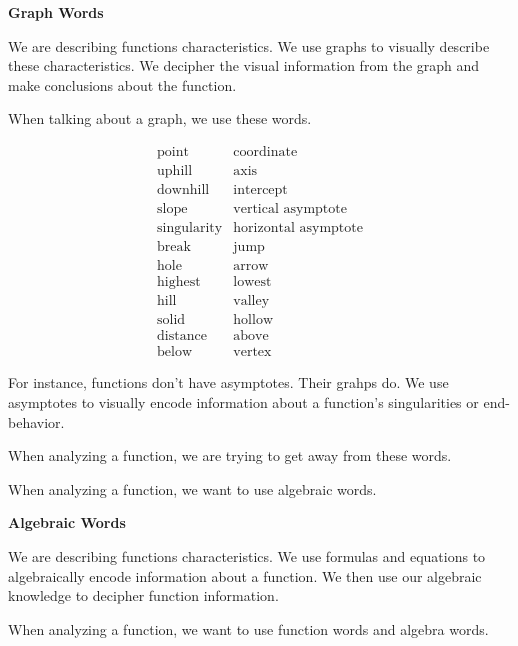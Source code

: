 \documentclass{ximera}
\begin{document}
\textbf{\textcolor{red!75!green}{Graph Words}}

We are describing functions characteristics. We use graphs to visually describe these characteristics.  We decipher the visual information from the graph and make conclusions about the function.

When talking about a graph, we use these words.


\[
\begin{array}{ll}
\text{point}  & \text{coordinate}  \\
\text{uphill}  & \text{axis} \\
\text{downhill}    &  \text{intercept} \\
\text{slope}  & \text{vertical asymptote} \\
\text{singularity}   & \text{horizontal asymptote} \\
\text{break} & \text{jump} \\
\text{hole} & \text{arrow} \\
\text{highest} & \text{lowest} \\
\text{hill} &  \text{valley} \\ 
\text{solid} &  \text{hollow} \\
\text{distance} &  \text{above}  \\
\text{below} &  \text{vertex} 
\end{array}
\]



For instance, functions don't have asymptotes. Their grahps do.  We use asymptotes to visually encode information about a function's singularities or end-behavior.


When analyzing a function, we are trying to get away from these words.



When analyzing a function, we want to use algebraic words.












\textbf{\textcolor{red!75!green}{Algebraic Words}}

We are describing functions characteristics. We use formulas and equations to algebraically encode information about a function. We then use our algebraic knowledge to decipher function information.


When analyzing a function, we want to use function words and algebra words.
\end{document}

